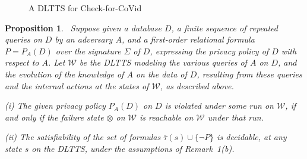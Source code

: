 \documentclass[pdflatex]{article}
\def \W{{\mathcal{W}}}
\newtheorem{propn}{Proposition}
\def \otau {\overline{\tau}}
\begin{document}
 \vspace*{-1mm}
 \begin{figure}[h]
  \centering
{}  

\vspace*{-1.5mm}
\caption{\label{fig:ex_dltts}A DLTTS for Check-for-CoVid}
 \end{figure}

 \vspace*{-1mm}
  \begin{propn}~\label{exact}
   Suppose given a database $D$, a finite sequence of repeated queries  on $D$ by an 
   adversary $A$, and a first-order relational formula $P = P_A(D)$ over the signature $\Sigma$
   of $D$,  expressing the privacy policy of $D$ with respect to $A$. Let $\W$ be the DLTTS
   modeling the various queries of $A$ on $D$, and the evolution of the knowledge of $A$
   on the data of $D$, resulting from these queries and the internal actions at the states of
   $\W$, as described above.

   (i) The given privacy policy  $P_A(D)$ on $D$ is violated under some run on $\W$, if and
   only if the failure state   $\otimes$ on  $\W$ is reachable on $\W$ under that run. 

      (ii) The satisfiability of the set of formulas $\otau(s) \cup \{\neg P\}$ is decidable,  
   at any state $s$ on the DLTTS, under the assumptions of Remark~1(b). 
  \end{propn}
  
\end{document}
